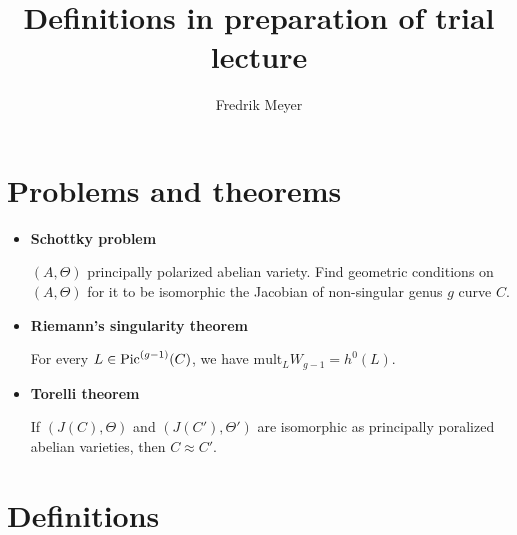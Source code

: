 \documentclass[11pt, english]{article}
\title{Definitions in preparation of trial lecture}
\author{Fredrik Meyer}
\date{}
\begin{document}
  
\maketitle

\section{Problems and theorems}

\begin{itemize}
	\item \textbf{Schottky problem}

	$(A,\Theta)$ principally polarized abelian variety. Find geometric conditions on $(A,\Theta)$ for it to be isomorphic the Jacobian of non-singular genus $g$ curve $C$.
	\item \textbf{Riemann's singularity theorem}

	For every $L \in \operatorname{Pic}^{(g-1)}(C)$, we have $\mathrm{mult}_L W_{g-1} = h^0(L)$.
	\item \textbf{Torelli theorem}

	If $(J(C), \Theta)$ and $(J(C'),\Theta')$ are isomorphic as principally poralized abelian varieties, then $C \approx C'$.
\end{itemize}

\section{Definitions}
\end{document}
